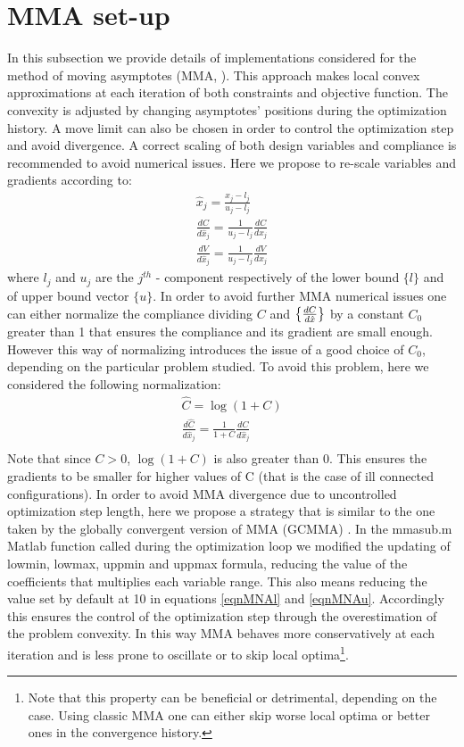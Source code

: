 \section{MMA set-up}
\label{A1}
In this subsection we provide details of implementations considered for the method of moving asymptotes (MMA, \cite{svanberg1987method}). This approach makes local convex approximations at each iteration of both constraints and objective function. The convexity is adjusted by changing asymptotes' positions during the optimization history. A move limit can also be chosen in order to control the optimization step and avoid divergence. A correct scaling of both design variables and compliance is recommended to avoid numerical issues. Here we propose to re-scale variables and gradients according to:
\begin{eqnarray}
\hat{x}_j= \frac{x_j-l_{j}}{u_j-l_j}\\
\frac{dC}{d\hat{x}_j}=\frac{1}{u_j-l_j}\frac{dC}{dx_j}\\
\frac{dV}{d\hat{x}_j}=\frac{1}{u_j-l_j}\frac{dV}{dx_j}
\end{eqnarray}
where $l_j$ and $u_j$ are the $j^{th}$ - component respectively of the lower bound $\{l\}$ and of upper bound vector $\{u\}$. 
In order to avoid further MMA numerical issues one can either normalize the compliance dividing $C$ and $\left\{{\frac{dC}{d\hat{x}}}\right\}$ by a constant $C_0$ greater than 1 that ensures the compliance and its gradient are small enough. However this way of normalizing introduces the issue of a good choice of $C_0$, depending on the particular problem studied. To avoid this problem, here we considered the following normalization:
\begin{eqnarray}
\hat{C}=\log{\left(1+C\right)}\\
\frac{d\hat{C}}{d\hat{x}_j}=\frac{1}{1+C}\frac{dC}{d\hat{x}_j}\\
\end{eqnarray}
Note that since $C>0$, $\log{\left(1+C\right)}$ is also greater than $0$. This ensures the gradients to be smaller for higher values of C (that is the case of ill connected configurations). In order to avoid MMA divergence due to uncontrolled optimization step length, here we propose a strategy that is similar to the one taken by the globally convergent version of MMA (GCMMA) \cite{svanberg2002class}. In the mmasub.m Matlab function called during the optimization loop we modified the updating of lowmin, lowmax, uppmin and uppmax formula, reducing the value of the coefficients that multiplies each variable range. This also means reducing the value set by default at 10 in equations \eqref{eqnMNAl} and \eqref{eqnMNAu}.
Accordingly this ensures the control of the optimization step through the overestimation of the problem convexity. In this way MMA behaves more conservatively at each iteration and is less prone to oscillate or to skip local optima\footnote{Note that this property can be beneficial or detrimental, depending on the case. Using classic MMA one can either skip worse local optima or better ones in the convergence history.}.